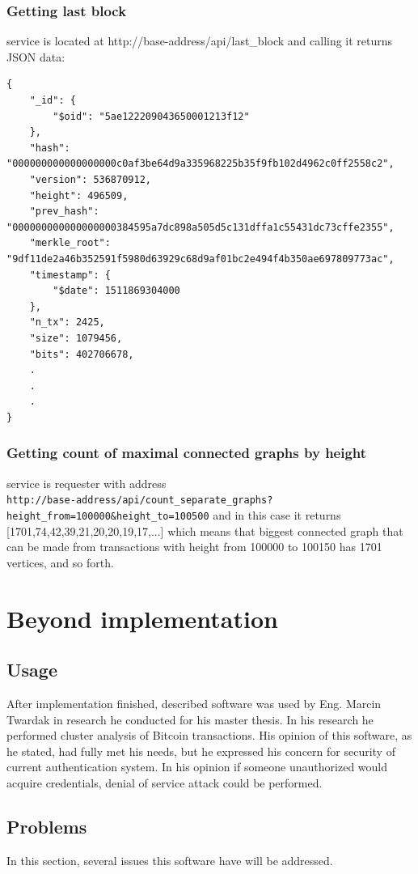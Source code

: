 \documentclass[12pt, en, eng, oneside]{mgr}
\begin{document}
\subsection{Getting last block}
service is located at http://base-address/api/last\_block and calling it returns JSON data:
\begin{verbatim}
{
    "_id": {
        "$oid": "5ae122209043650001213f12"
    },
    "hash": "000000000000000000c0af3be64d9a335968225b35f9fb102d4962c0ff2558c2",
    "version": 536870912,
    "height": 496509,
    "prev_hash": "000000000000000000384595a7dc898a505d5c131dffa1c55431dc73cffe2355",
    "merkle_root": "9df11de2a46b352591f5980d63929c68d9af01bc2e494f4b350ae697809773ac",
    "timestamp": {
        "$date": 1511869304000
    },
    "n_tx": 2425,
    "size": 1079456,
    "bits": 402706678,
    .
    .
    .
}
\end{verbatim}

\subsection{Getting count of maximal connected graphs by height}
service is requester with address
\\ \verb|http://base-address/api/count_separate_graphs?height_from=100000&height_to=100500|
and in this case it returns [1701,74,42,39,21,20,20,19,17,...] which means that biggest connected graph that can be made from transactions with height from 100000 to 100150 has 1701 vertices, and so forth.


\chapter{Beyond implementation}

\section{Usage}
After implementation finished, described software was used by Eng. Marcin Twardak in research he conducted for his master thesis. In his research he performed cluster analysis of Bitcoin transactions. His opinion of this software, as he stated, had fully met his needs, but he expressed his concern for security of current authentication system. In his opinion if someone unauthorized would acquire credentials, denial of service attack could be performed.

\section{Problems}
In this section, several issues this software have will be addressed.
\end{document}
